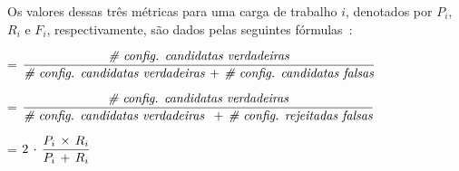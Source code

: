 \documentclass[12pt]{article}
\begin{document}
Os valores dessas três métricas para uma carga de trabalho $i$, denotados por $P_{i}$, $R_{i}$ e $F_{i}$, respectivamente, são dados pelas seguintes fórmulas~\cite{Baeza-Yates1999}:

\begin{description}
\scriptsize
  \item[$P_{i}$] = $\dfrac{\emph{\# config. candidatas verdadeiras}}{\emph{\# config. candidatas verdadeiras}\,+\,\emph{\# config. candidatas falsas}}$
  \smallskip
  \item[$R_{i}$] = $\dfrac{\emph{\# config. candidatas verdadeiras}}{\emph{\# config. candidatas verdadeiras }\,+\,\emph{\# config. rejeitadas falsas}}$
  \smallskip
  \item[$F_{i}$] = $2\,\cdot\,\dfrac{\emph{$P_{i}$}\,\times\,\emph{$R_{i}$}}{\emph{$P_{i}$}\,+\,\emph{$R_{i}$}}$
\end{description}

%
%
\end{document}
